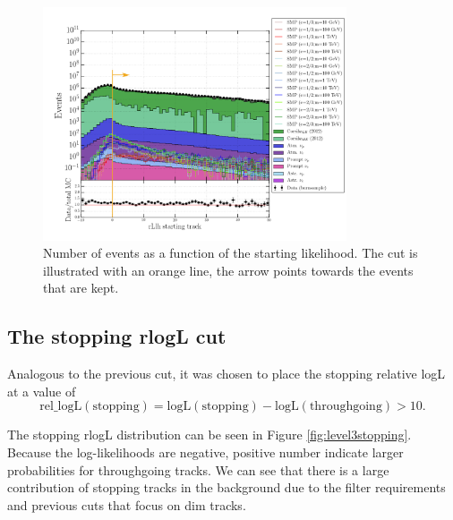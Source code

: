 \begin{figure}[t]
\centering
\includegraphics[width=0.8\textwidth]{chapter8/img/1D_stack_finitereco_rllh_starting_final.png}
\caption{Number of events as a function of the starting likelihood. The cut is illustrated with an orange line, the arrow points towards the events that are kept.}
\label{fig:level3starting}
\end{figure}

\subsection{The stopping rlogL cut}
Analogous to the previous cut, it was chosen to place the stopping relative logL at a value of
\begin{equation}
\textrm{rel\_logL}(\textrm{stopping}) = \textrm{logL}(\textrm{stopping}) - \textrm{logL}(\textrm{throughgoing}) > 10. 
\end{equation}

\noindent The stopping rlogL distribution can be seen in Figure \ref{fig:level3stopping}. Because the log-likelihoods are negative, positive number indicate larger probabilities for throughgoing tracks. We can see that there is a large contribution of stopping tracks in the background due to the filter requirements and previous cuts that focus on dim tracks.

